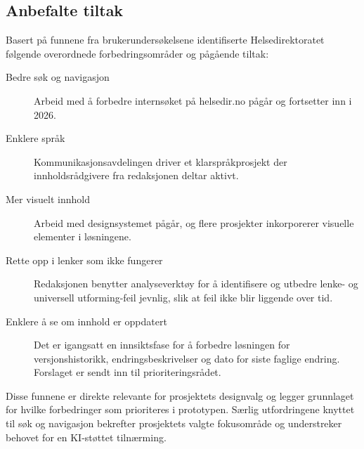 \subsection{Anbefalte tiltak}
\label{sec:anbefalte-tiltak}

Basert på funnene fra brukerundersøkelsene identifiserte Helsedirektoratet følgende overordnede forbedringsområder og pågående tiltak:

\begin{description}
    \item[Bedre søk og navigasjon] Arbeid med å forbedre internsøket på helsedir.no pågår og fortsetter inn i 2026.

    \item[Enklere språk] Kommunikasjonsavdelingen driver et klarspråkprosjekt der innholdsrådgivere fra redaksjonen deltar aktivt.

    \item[Mer visuelt innhold] Arbeid med designsystemet pågår, og flere prosjekter inkorporerer visuelle elementer i løsningene.

    \item[Rette opp i lenker som ikke fungerer] Redaksjonen benytter analyseverktøy for å identifisere og utbedre lenke- og universell utforming-feil jevnlig, slik at feil ikke blir liggende over tid.

    \item[Enklere å se om innhold er oppdatert] Det er igangsatt en innsiktsfase for å forbedre løsningen for versjonshistorikk, endringsbeskrivelser og dato for siste faglige endring. Forslaget er sendt inn til prioriteringsrådet.
\end{description}

Disse funnene er direkte relevante for prosjektets designvalg og legger grunnlaget for hvilke forbedringer som prioriteres i prototypen. Særlig utfordringene knyttet til søk og navigasjon bekrefter prosjektets valgte fokusområde og understreker behovet for en KI-støttet tilnærming.
